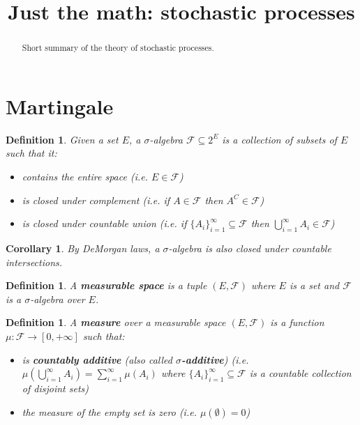 \documentclass{article}
\title{Just the math: stochastic processes}
\date{\vspace{-5ex}}
\newtheorem{defn}[equation]{Definition}
\newtheorem{coro}[equation]{Corollary}
\begin{document}
\maketitle


\begin{abstract}
Short summary of the theory of stochastic processes.
\end{abstract}

\section{Martingale}

\begin{defn}
	Given a set $E$, a $\sigma$-algebra $\mathcal{F} \subseteq 2^E$ is a collection of subsets of $E$ such that it:
	\begin{itemize}
		\item contains the entire space (i.e. $E \in \mathcal{F}$)
		\item is closed under complement (i.e. if $A \in \mathcal{F}$ then $A^C \in \mathcal{F}$)
		\item is closed under countable union (i.e. if $\{A_i\}_{i=1}^\infty \subseteq \mathcal{F}$ then $\bigcup_{i=1}^\infty A_i \in \mathcal{F}$)
	\end{itemize}
\end{defn}

\begin{coro}
	By DeMorgan laws, a $\sigma$-algebra is also closed under countable intersections.
\end{coro}

\begin{defn}
	A \textbf{measurable space} is a tuple $(E, \mathcal{F})$ where $E$ is a set and $\mathcal{F}$ is a $\sigma$-algebra over $E$.
\end{defn}

\begin{defn}
	A \textbf{measure} over a measurable space $(E, \mathcal{F})$ is a function $\mu : \mathcal{F} \to [0, +\infty]$ such that:
	\begin{itemize}
	\item is \textbf{countably additive} (also called \textbf{$\sigma$-additive}) (i.e. $\mu(\bigcup_{i=1}^\infty A_i) = \sum_{i=1}^\infty \mu( A_i)$ where $\{A_i\}_{i=1}^\infty \subseteq \mathcal{F}$ is a countable collection of disjoint sets)
	\item the measure of the empty set is zero (i.e. $\mu(\emptyset) = 0$)
\end{itemize}
\end{defn}
\end{document}
